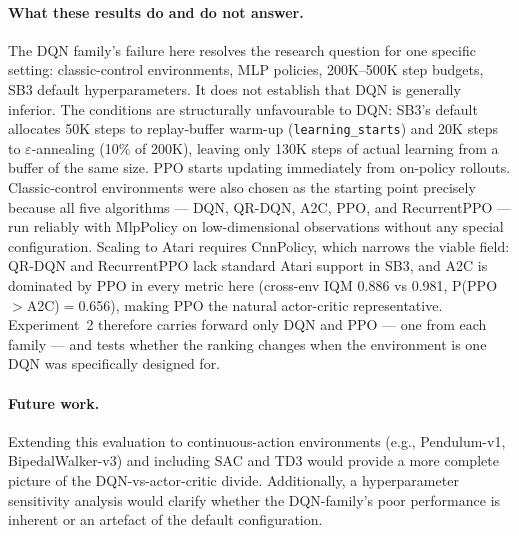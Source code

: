 {\color{red} \paragraph{What these results do and do not answer.}
The DQN family's failure here resolves the research question for one specific setting: classic-control environments, MLP policies, 200K--500K step budgets, SB3 default hyperparameters. It does not establish that DQN is generally inferior. The conditions are structurally unfavourable to DQN: SB3's default allocates 50K steps to replay-buffer warm-up (\texttt{learning\_starts}) and 20K steps to $\varepsilon$-annealing (10\% of 200K), leaving only 130K steps of actual learning from a buffer of the same size. PPO starts updating immediately from on-policy rollouts. Classic-control environments were also chosen as the starting point precisely because all five algorithms --- DQN, QR-DQN, A2C, PPO, and RecurrentPPO --- run reliably with MlpPolicy on low-dimensional observations without any special configuration. Scaling to Atari requires CnnPolicy, which narrows the viable field: QR-DQN and RecurrentPPO lack standard Atari support in SB3, and A2C is dominated by PPO in every metric here (cross-env IQM 0.886 vs 0.981, P(PPO$>$A2C)$=$0.656), making PPO the natural actor-critic representative. Experiment~2 therefore carries forward only DQN and PPO --- one from each family --- and tests whether the ranking changes when the environment is one DQN was specifically designed for.}

\paragraph{Future work.}
Extending this evaluation to continuous-action environments
(e.g., Pendulum-v1, BipedalWalker-v3) and including SAC and TD3 would
provide a more complete picture of the DQN-vs-actor-critic divide.
Additionally, a hyperparameter sensitivity analysis would clarify
whether the DQN-family's poor performance is inherent or an artefact
of the default configuration.


